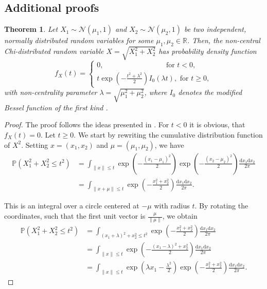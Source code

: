 \documentclass[a4paper,12pt]{article}
\newcommand{\norm}[1]{\lVert#1\rVert}
\theoremstyle{plain}
\newtheorem{theorem}{Theorem}[section]
\theoremstyle{definition}
\numberwithin{equation}{section}
\begin{document}
\begin{appendix}
	\section{Additional proofs}\label{appendix: proofs}
	
	\begin{theorem}\label{thm: pdfchi}
		Let $X_1 \sim \mathcal{N}(\mu_1, 1)$ and $X_2 \sim \mathcal{N}(\mu_2, 1)$ be two independent, normally distributed random variables for some $\mu_1, \mu_2 \in \mathbb{R}$. Then, the non-central Chi-distributed random variable $X = \sqrt{X_1^2 + X_2^2}$ has probability density function
		\begin{equation}\label{eq: pdfchi}
			f_X(t) =
			\begin{cases}
				0, \hspace{100pt} \textrm{ for } t < 0, \\
				t \exp \left( - \frac{t^2 + \lambda^2}{2} \right) I_0 ( \lambda t ), \textrm{ for } t \geq 0,
			\end{cases}
		\end{equation}
		with non-centrality parameter $\lambda = \sqrt{\mu_1^2 + \mu_2^2}$, where $I_0$ denotes the modified Bessel function of the first kind \cite[p.~910-911]{TISP}.
	\end{theorem}
	\begin{proof}
		The proof follows the ideas presented in \cite{NonCentralChi}. For $t < 0$ it is obvious, that $f_X(t) = 0$. Let $t \geq 0$. We start by rewriting the cumulative distribution function of $X^2$. Setting $x = (x_1, x_2)$ and $\mu = (\mu_1, \mu_2)$, we have
		\begin{align*}
			\mathbb{P}\left( X_1^2 + X_2^2 \leq t^2 \right) &= \int_{\norm{x} \leq t} \exp \left( - \frac{(x_1 - \mu_1)^2}{2} \right) \exp \left( - \frac{(x_2 - \mu_2)^2}{2} \right) \frac{\mathrm{d}x_1 \mathrm{d}x_2}{2 \pi} \\
			&= \int_{\norm{x + \mu} \leq t} \exp \left( - \frac{x_1^2 + x_2^2}{2} \right) \frac{\mathrm{d}x_1 \mathrm{d}x_2}{2 \pi}.
		\end{align*}
		
		This is an integral over a circle centered at $-\mu$ with radius $t$. By rotating the coordinates, such that the first unit vector is $\frac{\mu}{\norm{\mu}}$, we obtain
		\begin{align*}
			\mathbb{P}\left( X_1^2 + X_2^2 \leq t^2 \right) &= \int_{(x_1 + \lambda)^2 + x_2^2 \leq t^2} \exp \left( - \frac{x_1^2 + x_2^2}{2} \right) \frac{\mathrm{d}x_1 \mathrm{d}x_2}{2 \pi} \\
			&= \int_{\norm{x} \leq t} \exp \left( - \frac{(x_1 - \lambda)^2 + x_2^2}{2} \right) \frac{\mathrm{d}x_1 \mathrm{d}x_2}{2 \pi} \\
			&= \int_{\norm{x} \leq t} \exp \left( \lambda x_1 - \frac{\lambda^2}{2} \right) \exp \left( - \frac{x_1^2 + x_2^2}{2} \right) \frac{\mathrm{d}x_1 \mathrm{d}x_2}{2 \pi}.
		\end{align*}
		

\end{proof}
\end{appendix}
\end{document}
